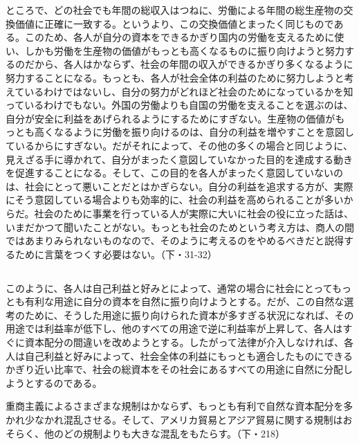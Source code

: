 ところで、どの社会でも年間の総収入はつねに、労働による年間の総生産物の交換価値に正確に一致する。というより、この交換価値とまったく同じものである。このため、各人が自分の資本をできるかぎり国内の労働を支えるために使い、しかも労働を生産物の価値がもっとも高くなるものに振り向けようと努力するのだから、各人はかならず、社会の年間の収入ができるかぎり多くなるように努力することになる。もっとも、各人が社会全体の利益のために努力しようと考えているわけではないし、自分の努力がどれほど社会のためになっているかを知っているわけでもない。外国の労働よりも自国の労働を支えることを選ぶのは、自分が安全に利益をあげられるようにするためにすぎない。生産物の価値がもっとも高くなるように労働を振り向けるのは、自分の利益を増やすことを意図しているからにすぎない。だがそれによって、その他の多くの場合と同じように、見えざる手に導かれて、自分がまったく意図していなかった目的を達成する動きを促進することになる。そして、この目的を各人がまったく意図していないのは、社会にとって悪いことだとはかぎらない。自分の利益を追求する方が、実際にそう意図している場合よりも効率的に、社会の利益を高められることが多いからだ。社会のために事業を行っている人が実際に大いに社会の役に立った話は、いまだかつて聞いたことがない。もっとも社会のためという考え方は、商人の間ではあまりみられないものなので、そのように考えるのをやめるべきだと説得するために言葉をつくす必要はない。（下・31-32）

\subsection{}



このように、各人は自己利益と好みとによって、通常の場合に社会にとってもっとも有利な用途に自分の資本を自然に振り向けようとする。だが、この自然な選考のために、そうした用途に振り向けられた資本が多すぎる状況になれば、その用途では利益率が低下し、他のすべての用途で逆に利益率が上昇して、各人はすぐに資本配分の間違いを改めようとする。したがって法律が介入しなければ、各人は自己利益と好みによって、社会全体の利益にもっとも適合したものにできるかぎり近い比率で、社会の総資本をその社会にあるすべての用途に自然に分配しようとするのである。

重商主義によるさまざまな規制はかならず、もっとも有利で自然な資本配分を多かれ少なかれ混乱させる。そして、アメリカ貿易とアジア貿易に関する規制はおそらく、他のどの規制よりも大きな混乱をもたらす。（下・218）

\subsection{}



